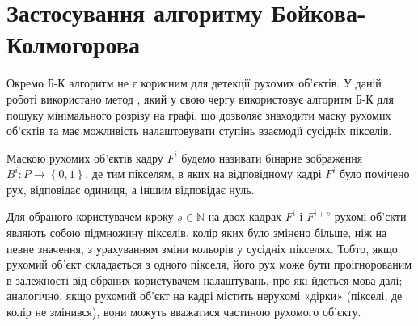 \section{Застосування алгоритму Бойкова-Колмогорова}

Окремо Б-К алгоритм не є корисним для детекції рухомих об'єктів. У даній роботі 
використано метод \cite{pavliuk_krygin}, який у свою чергу використовує алгоритм Б-К 
для пошуку мінімального розрізу на графі, що дозволяє знаходити
маску рухомих об'єктів та має можливість налаштовувати ступінь взаємодії сусідніх
пікселів.
\begin{definition}
Маскою рухомих об'єктів кадру \(F^{i}\) будемо називати бінарне
зображення \(B^{i}:P \rightarrow \left\{ 0,1 \right\}\), де тим
пікселям, в яких на відповідному кадрі \(F^{i}\) було помічено рух,
відповідає одиниця, а іншим відповідає нуль.
\end{definition}

Для обраного користувачем
кроку $s \in \mathbb{N}$ на двох кадрах \(F^{i}\) і \(F^{i + s}\) рухомі об'єкти
являють собою підмножину пікселів, колір яких було змінено більше, ніж
на певне значення, з урахуванням зміни кольорів у сусідніх пікселях.
Тобто, якщо рухомий об'єкт складається з одного пікселя, його рух може
бути проігнорованим в залежності від обраних користувачем налаштувань,
про які йдеться мова далі; аналогічно, якщо рухомий об'єкт на кадрі
містить нерухомі «дірки» (пікселі, де колір не змінився), вони можуть
вважатися частиною рухомого об'єкту.

